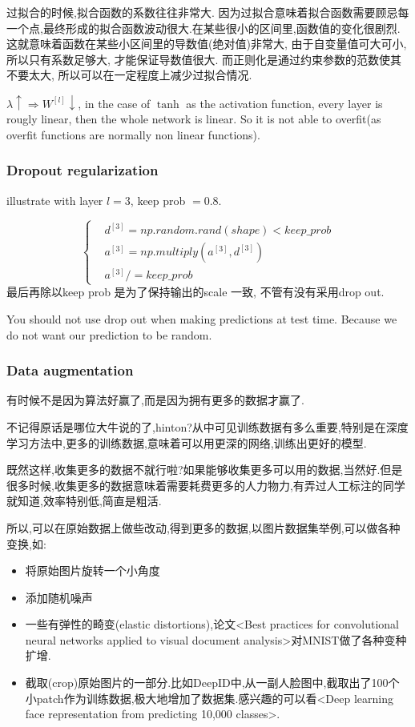 过拟合的时候,拟合函数的系数往往非常大.
因为过拟合意味着拟合函数需要顾忌每一个点,最终形成的拟合函数波动很大.在某些很小的区间里,函数值的变化很剧烈.
这就意味着函数在某些小区间里的导数值(绝对值)非常大, 由于自变量值可大可小, 所以只有系数足够大, 才能保证导数值很大.
而正则化是通过约束参数的范数使其不要太大, 所以可以在一定程度上减少过拟合情况.

$\lambda \uparrow \Longrightarrow W^{[l]} \downarrow$, in the case of $\tanh$ as the activation function, every layer is rougly linear, then the whole network is linear.
So it is not able to overfit(as overfit functions are normally non linear functions).

\subsubsection{Dropout regularization}
illustrate with layer $l = 3$, keep prob $= 0.8$.

$$
\left\{
\begin{aligned}
& d^{[3]} = np.random.rand(shape) < keep\_prob \\
& a^{[3]} = np.multiply(a^{[3]}, d^{[3]}) \\
& a^{[3]} /= keep\_prob
\end{aligned}
\right.
$$
最后再除以keep prob 是为了保持输出的scale 一致, 不管有没有采用drop out.

You should not use drop out when making predictions at test time. Because we do not want our prediction to be random.

\subsubsection{Data augmentation}
有时候不是因为算法好赢了,而是因为拥有更多的数据才赢了.

不记得原话是哪位大牛说的了,hinton?从中可见训练数据有多么重要,特别是在深度学习方法中,更多的训练数据,意味着可以用更深的网络,训练出更好的模型.

既然这样,收集更多的数据不就行啦?如果能够收集更多可以用的数据,当然好.但是很多时候,收集更多的数据意味着需要耗费更多的人力物力,有弄过人工标注的同学就知道,效率特别低,简直是粗活.

所以,可以在原始数据上做些改动,得到更多的数据,以图片数据集举例,可以做各种变换,如:
\begin{itemize}
\item 将原始图片旋转一个小角度
\item 添加随机噪声
\item 一些有弹性的畸变(elastic distortions),论文<Best practices for convolutional neural networks applied to visual document analysis>对MNIST做了各种变种扩增.
\item 截取(crop)原始图片的一部分.比如DeepID中,从一副人脸图中,截取出了100个小patch作为训练数据,极大地增加了数据集.感兴趣的可以看<Deep learning face representation from predicting 10,000 classes>.
\end{itemize}


